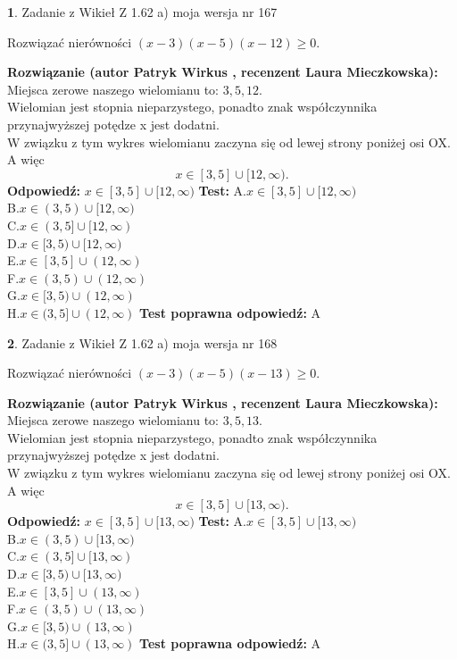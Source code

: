 \documentclass[12pt, a4paper]{article}
\theoremstyle{definition} %
\newtheorem{zad}{}
\newcommand{\zadStart}[1]{\begin{zad}#1\newline}
\newcommand{\zadStop}{\end{zad}}
\newcommand{\rozwStart}[2]{\noindent \textbf{Rozwiązanie (autor #1 , recenzent #2): }\newline}
\newcommand{\rozwStop}{\newline}
\newcommand{\odpStart}{\noindent \textbf{Odpowiedź:}\newline}
\newcommand{\odpStop}{\newline}
\newcommand{\testStart}{\noindent \textbf{Test:}\newline}
\newcommand{\testStop}{\newline}
\newcommand{\kluczStart}{\noindent \textbf{Test poprawna odpowiedź:}\newline}
\newcommand{\kluczStop}{\newline}
\begin{document}
\zadStart{Zadanie z Wikieł Z 1.62 a) moja wersja nr 167}

Rozwiązać nierówności $(x-3)(x-5)(x-12)\ge0$.
\zadStop
\rozwStart{Patryk Wirkus}{Laura Mieczkowska}
Miejsca zerowe naszego wielomianu to: $3, 5, 12$.\\
Wielomian jest stopnia nieparzystego, ponadto znak współczynnika przy\linebreak najwyższej potędze x jest dodatni.\\ W związku z tym wykres wielomianu zaczyna się od lewej strony poniżej osi OX. A więc $$x \in [3,5] \cup [12,\infty).$$
\rozwStop
\odpStart
$x \in [3,5] \cup [12,\infty)$
\odpStop
\testStart
A.$x \in [3,5] \cup [12,\infty)$\\
B.$x \in (3,5) \cup [12,\infty)$\\
C.$x \in (3,5] \cup [12,\infty)$\\
D.$x \in [3,5) \cup [12,\infty)$\\
E.$x \in [3,5] \cup (12,\infty)$\\
F.$x \in (3,5) \cup (12,\infty)$\\
G.$x \in [3,5) \cup (12,\infty)$\\
H.$x \in (3,5] \cup (12,\infty)$
\testStop
\kluczStart
A
\kluczStop



\zadStart{Zadanie z Wikieł Z 1.62 a) moja wersja nr 168}

Rozwiązać nierówności $(x-3)(x-5)(x-13)\ge0$.
\zadStop
\rozwStart{Patryk Wirkus}{Laura Mieczkowska}
Miejsca zerowe naszego wielomianu to: $3, 5, 13$.\\
Wielomian jest stopnia nieparzystego, ponadto znak współczynnika przy\linebreak najwyższej potędze x jest dodatni.\\ W związku z tym wykres wielomianu zaczyna się od lewej strony poniżej osi OX. A więc $$x \in [3,5] \cup [13,\infty).$$
\rozwStop
\odpStart
$x \in [3,5] \cup [13,\infty)$
\odpStop
\testStart
A.$x \in [3,5] \cup [13,\infty)$\\
B.$x \in (3,5) \cup [13,\infty)$\\
C.$x \in (3,5] \cup [13,\infty)$\\
D.$x \in [3,5) \cup [13,\infty)$\\
E.$x \in [3,5] \cup (13,\infty)$\\
F.$x \in (3,5) \cup (13,\infty)$\\
G.$x \in [3,5) \cup (13,\infty)$\\
H.$x \in (3,5] \cup (13,\infty)$
\testStop
\kluczStart
A
\kluczStop
\end{document}
